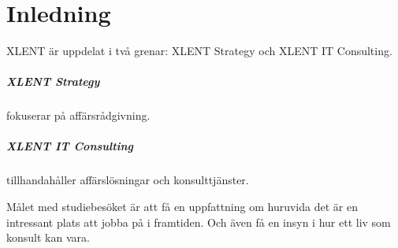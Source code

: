 \documentclass[../report.tex]{subfiles}
\begin{document}
    \chapter{Inledning}
    XLENT är uppdelat i två grenar: XLENT Strategy och XLENT IT Consulting.
    
    \paragraph{XLENT Strategy} fokuserar på affärsrådgivning.
    
    \paragraph{XLENT IT Consulting} tillhandahåller affärslösningar och konsulttjänster.
    
    \bigskip
    
    Målet med studiebesöket är att få en uppfattning om huruvida det är en intressant plats att jobba på i framtiden. Och även få en insyn i hur ett liv som konsult kan vara.
\end{document}
